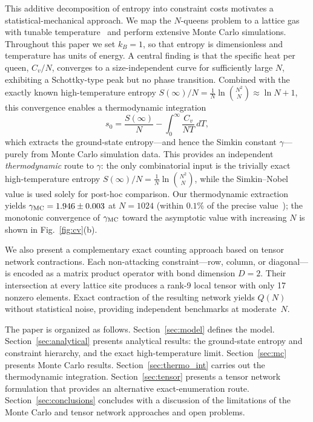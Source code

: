 \documentclass[aps, pre, reprint, amsmath, amssymb, superscriptaddress, floatfix]{revtex4-2}
\begin{document}
This additive decomposition of entropy into constraint costs motivates
a statistical-mechanical approach.  We map the $N$-queens
problem to a lattice gas with tunable
temperature~\cite{Zhang2009,Polson2024} and perform extensive Monte
Carlo simulations.  Throughout this paper we set $k_B = 1$, so that
entropy is dimensionless and temperature has units of energy.
A central finding is that the specific heat per
queen, $C_v/N$, converges to a size-independent curve for
sufficiently large $N$, exhibiting a Schottky-type peak but no phase
transition.  Combined with the exactly known high-temperature entropy
$S(\infty)/N = \frac{1}{N}\ln\binom{N^2}{N} \approx \ln N + 1$,
this convergence enables a thermodynamic integration
\begin{equation*}
  s_0 = \frac{S(\infty)}{N} - \int_0^\infty \frac{C_v}{NT}\,dT,
\end{equation*}
which extracts the ground-state entropy---and hence the Simkin
constant $\gamma$---purely from Monte Carlo simulation data.
This provides an independent \emph{thermodynamic} route to $\gamma$:
the only combinatorial input is the trivially exact high-temperature
entropy $S(\infty)/N = \frac{1}{N}\ln\binom{N^2}{N}$, while the
Simkin--Nobel value is used solely for post-hoc comparison.
Our thermodynamic extraction yields $\gamma_{\rm MC} = 1.946 \pm 0.003$ at
$N = 1024$ (within $0.1\%$ of the precise value~\cite{Nobel2023});
the monotonic convergence of $\gamma_{\rm MC}$ toward the asymptotic
value with increasing $N$ is shown in Fig.~\ref{fig:cv}(b).

We also present a complementary exact counting approach based on tensor
network contractions.  Each non-attacking constraint---row, column, or
diagonal---is encoded as a matrix product operator with bond
dimension $D = 2$.  Their intersection at every lattice site produces
a rank-9 local tensor with only 17 nonzero elements.  Exact
contraction of the resulting network yields $Q(N)$ without
statistical noise, providing independent benchmarks at moderate~$N$.

The paper is organized as follows.
Section~\ref{sec:model} defines the model.
Section~\ref{sec:analytical} presents analytical results: the
ground-state entropy and constraint hierarchy, and the exact
high-temperature limit.
Section~\ref{sec:mc} presents Monte Carlo results.
Section~\ref{sec:thermo_int} carries out the thermodynamic integration.
Section~\ref{sec:tensor} presents a tensor network formulation that
provides an alternative exact-enumeration route.
Section~\ref{sec:conclusions} concludes with a discussion of the limitations of the Monte Carlo and tensor network approaches and open problems.
\end{document}
